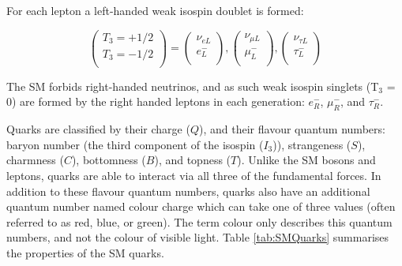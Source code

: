 \documentclass[12pt,a4paper,epsf,portrait,times,epsfig]{article}
\begin{document}
For each lepton a left-handed weak isospin doublet is formed:

\begin{equation}
	\begin{pmatrix}
		T_{3} = +1/2  \\
		T_{3} = -1/2  \\
	\end{pmatrix}=\begin{pmatrix}
		\nu_{eL} \\
		e_{L}^{-} \\
	\end{pmatrix},\begin{pmatrix}
		\nu_{\mu L} \\
		\mu_{L}^{-} \\
	\end{pmatrix},\begin{pmatrix}
		\nu_{\tau L} \\
		\tau_{L}^{-} \\
	\end{pmatrix}
\end{equation}

The SM forbids right-handed neutrinos, and as such weak isospin singlets (T$_{3}$ = 0) are formed by the right handed leptons in each generation: $e^{-}_{R}$, $\mu^{-}_{R}$, and $\tau^{-}_{R}$. 

Quarks are classified by their charge ($Q$), and their flavour quantum numbers: baryon number (the third component of the isospin ($I_{3}$)), strangeness ($S$), charmness ($C$), bottomness ($B$), and topness ($T$). Unlike the SM bosons and leptons, quarks are able to interact via all three of the fundamental forces. In addition to these flavour quantum numbers, quarks also have an additional quantum number named colour charge which can take one of three values (often referred to as red, blue, or green). The term colour only describes this quantum numbers, and not the colour of visible light. Table \ref{tab:SMQuarks} summarises the properties of the SM quarks.  
\end{document}
